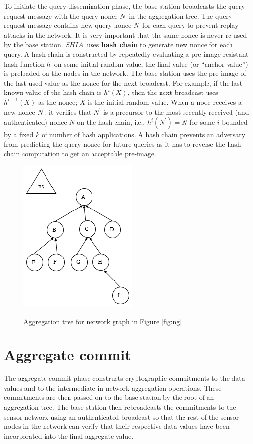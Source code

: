 		To initiate the query dissemination phase, the base station broadcasts the query request message with the query nonce $N$\ in the aggregation tree. 
		The query request message contains new query nonce $N$\ for each query to prevent replay attacks in the network.
		It is very important that the same nonce is never re-used by the base station.
		$SHIA$\ uses \textbf{hash chain} to generate new nonce for each query. 
		A hash chain is constructed by repeatedly evaluating a pre-image resistant hash function $h$\ on some initial random value, the final value (or ``anchor value'') is preloaded on the nodes in the network.
		The base station uses the pre-image of the last used  value as the nonce for the next broadcast.
		For example, if the last known value of the hash chain is $h^i(X)$, then the next broadcast uses $h^{i-1}(X)$ as the nonce; $X$ is the initial random value.
		When a node receives a new nonce $N^{'}$, it verifies that $N^{'}$ is a precursor to the most recently received (and authenticated) nonce $N$ on the hash chain, i.e., $h^{i}(N^{'}) = N$ for some $i$ bounded by a fixed $k$ of number of hash applications.  
		A hash chain prevents an adversary from predicting the query nonce for future queries as it has to reverse the hash chain computation to get an acceptable pre-image.
		\begin{figure}[h!]
			\centering
			\includegraphics[scale = 1]{images/aggregation-tree.png}\\
			\caption{Aggregation tree for network graph in Figure \ref{fig:ng}}
			\label{fig:at}
		\end{figure}		
	\section{Aggregate commit} 
		\label{sub:aggregate_commit}
		The aggregate commit phase constructs cryptographic commitments to the data values and to the intermediate in-network aggregation operations.
		These commitments are then passed on to the base station by the root of an aggregation tree.
		The base station then rebroadcasts the commitments to the sensor network using an authenticated broadcast so that the rest of the sensor nodes in the network can verify that their respective data values have been incorporated into the final aggregate value.

